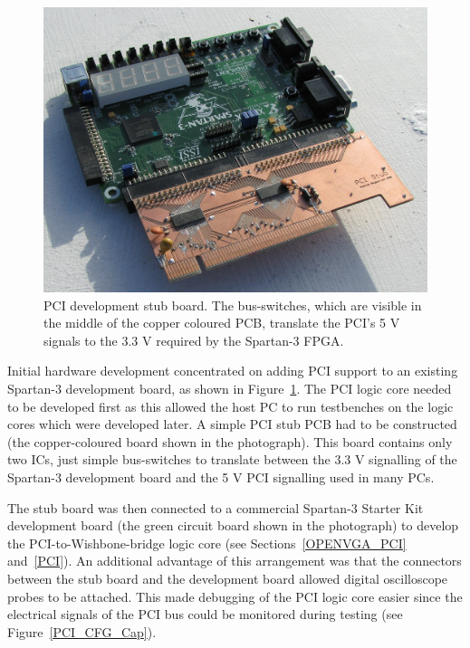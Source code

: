 \begin{figure}[h]
\begin{center}
\includegraphics[width=\linewidth]{images/pci_stub.jpeg}
\caption[PCI development stub board]{PCI development stub board. The
bus-switches, which are visible in the middle of the copper coloured PCB,
translate the PCI's 5 V signals to the 3.3 V required by the Spartan-3 FPGA.}
\label{OPENVGA_PCI_Stub}
\end{center}
\end{figure}

Initial hardware development concentrated on adding PCI support to an existing
Spartan-3 development board, as shown in Figure~\ref{OPENVGA_PCI_Stub}. The PCI
logic core needed to be developed first as this allowed the host PC to run
testbenches on the logic cores which were developed later. A simple PCI stub PCB
had to be constructed (the copper-coloured board shown in the photograph). This
board contains only two ICs, just simple bus-switches to translate between the
3.3 V signalling of the Spartan-3 development board and the 5 V PCI signalling
used in many PCs.

The stub board was then connected to a commercial Spartan-3 Starter Kit
development board (the green circuit board shown in the photograph) to develop
the PCI-to-Wishbone-bridge logic core (see Sections~\ref{OPENVGA_PCI}
and~\ref{PCI}). An additional advantage of this arrangement was that the
connectors between the stub board and the development board allowed digital
oscilloscope probes to be attached. This made debugging of the PCI logic core
easier since the electrical signals of the PCI bus could be monitored during
testing (see Figure~\ref{PCI_CFG_Cap}).

